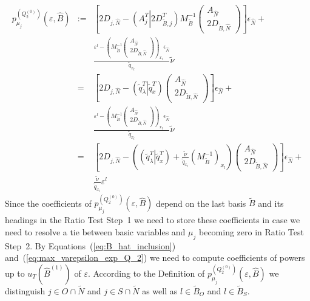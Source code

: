 \documentclass[a4paper]{article}
\newcommand{\pmu}[2]{\ensuremath{p_{\mu_{j}}^{(#1)}(\varepsilon, #2)}}
\begin{document}
\begin{eqnarray}
\pmu{Q_{2}^{(0)}}{\hat{B}} &:=& 
  \left[
      2D_{j, \hat{N}} - \left(A_{j}^{T} \left| \right. 2D_{\tilde{B}, j}^{T}
        \right)
      M_{\tilde{B}}^{-1}
      \left(\begin{array}{c}
              A_{\hat{N}} \\
	      \hline
	      2D_{\tilde{B}, \hat{N}}
	    \end{array}
      \right)
   \right]\epsilon_{\hat{N}} +
\nonumber \\ 
  &&
  \frac{\varepsilon^{l} -
         \left(M_{\tilde{B}}^{-1}
           \left(\begin{array}{c}
                    A_{\hat{N}}  \\
	            \hline
	            2D_{\tilde{B}, \hat{N}}
	         \end{array}
	   \right)
         \right)_{x_{l}}\epsilon_{\hat{N}}}{\tilde{q}_{x_{l}}}\tilde{\nu}
\nonumber \\
&=&
  \left[
      2D_{j, \hat{N}}
      - \left(\tilde{q}_{\lambda}^{T} \left| \right. \tilde{q}_{x}^{T}\right)
      \left(\begin{array}{c}
              A_{\hat{N}} \\
	      \hline
	      2D_{\tilde{B}, \hat{N}}
	    \end{array}
      \right)
   \right]\epsilon_{\hat{N}} +
\nonumber \\ 
  &&
  \frac{\varepsilon^{l} -
         \left(M_{\tilde{B}}^{-1}
           \left(\begin{array}{c}
                    A_{\hat{N}}  \\
	            \hline
	            2D_{\tilde{B}, \hat{N}}
	         \end{array}
	   \right)
         \right)_{x_{l}}\epsilon_{\hat{N}}}{\tilde{q}_{x_{l}}}\tilde{\nu}
\nonumber \\
&=&
  \left[
      2D_{j, \hat{N}}
      -\left(
         \left(\tilde{q}_{\lambda}^{T} \left| \right. \tilde{q}_{x}^{T}\right)
         + \frac{\tilde{\nu}}{\tilde{q}_{x_{l}}}
	 \left(M_{\tilde{B}}^{-1}\right)_{x_{l}}
       \right)
      \left(\begin{array}{c}
              A_{\hat{N}} \\
	      \hline
	      2D_{\tilde{B}, \hat{N}}
	    \end{array}
      \right)
   \right]\epsilon_{\hat{N}} +
\nonumber \\
  &&
\frac{\tilde{\nu}}{\tilde{q}_{x_{l}}}\varepsilon^{l}
\end{eqnarray}
Since the coefficients of \pmu{Q_{2}^{(0)}}{\hat{B}} depend on
the last basis $\tilde{B}$ and its headings in the Ratio Test Step~1 we need
to store these coefficients in case we need to resolve a tie between basic
variables and $\mu_{j}$ becoming zero in Ratio Test Step~2. By
Equations~(\ref{eq:B_hat_inclusion}) and~(\ref{eq:max_varepsilon_exp_Q_2}) we
need to compute coefficients of powers up to $u_{T}(\hat{B}^{(1)})$ of
$\varepsilon$. According to the Definition of
\pmu{Q_{2}^{(0)}}{\hat{B}} we distinguish $j \in O \cap \tilde{N}$
and $j \in S \cap \tilde{N}$ as well as $l \in \tilde{B}_{O}$ and
$l \in \tilde{B}_{S}$.
\end{document}
